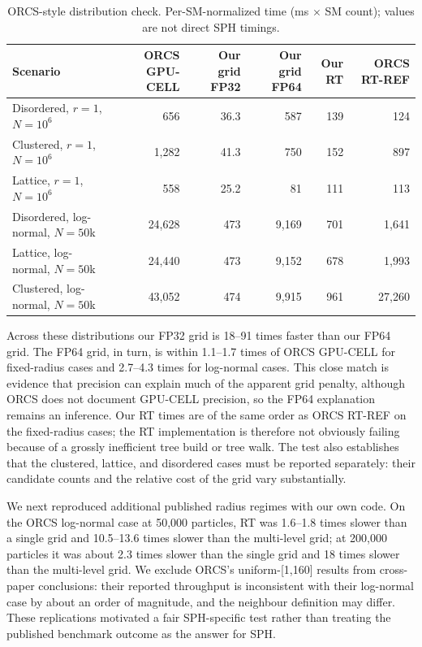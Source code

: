 \documentclass[conference]{IEEEtran}
\begin{document}
\begin{table}[!htb]
\centering
\caption{ORCS-style distribution check. Per-SM-normalized time (ms $\times$ SM count); values are not direct SPH timings.}
\label{tab:orcs_control}
\scriptsize
\setlength{\tabcolsep}{4.2pt}
\begin{tabular}{@{}l r r r r r@{}}
\toprule
Scenario & ORCS GPU-CELL & Our grid FP32 & Our grid FP64 & Our RT & ORCS RT-REF \\
\midrule
Disordered, $r=1$, $N=10^6$ & 656 & 36.3 & 587 & 139 & 124 \\
Clustered, $r=1$, $N=10^6$ & 1,282 & 41.3 & 750 & 152 & 897 \\
Lattice, $r=1$, $N=10^6$ & 558 & 25.2 & 81 & 111 & 113 \\
Disordered, log-normal, $N=50$k & 24,628 & 473 & 9,169 & 701 & 1,641 \\
Lattice, log-normal, $N=50$k & 24,440 & 473 & 9,152 & 678 & 1,993 \\
Clustered, log-normal, $N=50$k & 43,052 & 474 & 9,915 & 961 & 27,260 \\
\bottomrule
\end{tabular}
\end{table}

Across these distributions our FP32 grid is 18--91 times faster than our FP64 grid. The FP64 grid, in turn, is within 1.1--1.7 times of ORCS GPU-CELL for fixed-radius cases and 2.7--4.3 times for log-normal cases. This close match is evidence that precision can explain much of the apparent grid penalty, although ORCS does not document GPU-CELL precision, so the FP64 explanation remains an inference. Our RT times are of the same order as ORCS RT-REF on the fixed-radius cases; the RT implementation is therefore not obviously failing because of a grossly inefficient tree build or tree walk. The test also establishes that the clustered, lattice, and disordered cases must be reported separately: their candidate counts and the relative cost of the grid vary substantially.

We next reproduced additional published radius regimes with our own code. On the ORCS log-normal case at 50,000 particles, RT was 1.6--1.8 times slower than a single grid and 10.5--13.6 times slower than the multi-level grid; at 200,000 particles it was about 2.3 times slower than the single grid and 18 times slower than the multi-level grid. We exclude ORCS's uniform-[1,160] results from cross-paper conclusions: their reported throughput is inconsistent with their log-normal case by about an order of magnitude, and the neighbour definition may differ. These replications motivated a fair SPH-specific test rather than treating the published benchmark outcome as the answer for SPH.
\end{document}

